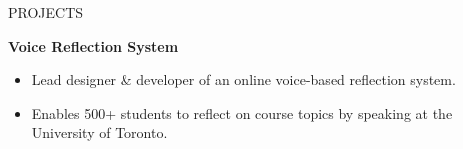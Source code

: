 \documentclass{resume} %
\begin{document}
\begin{rSection}{PROJECTS}
    \item \textbf{Voice Reflection System}
    \begin{itemize}
        \item Lead designer \& developer of an online voice-based reflection system.
        \item Enables 500+ students to reflect on course topics by speaking at the University of Toronto.
    \end{itemize}

\end{rSection} 
\end{document}
